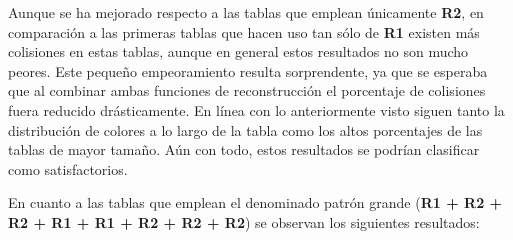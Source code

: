 \documentclass[12pt,spanish,listoffigures,listoftables]{tfgetsinf}
\begin{document}
Aunque se ha mejorado respecto a las tablas que emplean únicamente \textbf{R2}, en comparación a las primeras tablas que hacen uso tan sólo de \textbf{R1} existen más colisiones en estas tablas, aunque en general estos resultados no son mucho peores. Este pequeño empeoramiento resulta sorprendente, ya que se esperaba que al combinar ambas funciones de reconstrucción el porcentaje de colisiones fuera reducido drásticamente. En línea con lo anteriormente visto siguen tanto la distribución de colores a lo largo de la tabla como los altos porcentajes de las tablas de mayor tamaño. Aún con todo, estos resultados se podrían clasificar como satisfactorios.

En cuanto a las tablas que emplean el denominado patrón grande (\textbf{R1 + R2 + R2 + R1 + R1 + R2 + R2 + R2}) se observan los siguientes resultados:
\\
\\
\\
\end{document}
